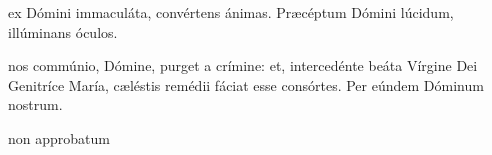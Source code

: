 \documentclass[fontsize=9.5pt,paper=A6,twoside,BCOR=1mm,DIV=21,headinclude]{scrarticle}
\begin{document}
\begin{multicols}{2}

ex Dómini immaculáta, convértens ánimas. Præcéptum Dómini lúcidum, illúminans óculos.

 nos commúnio, Dómine, purget a crímine: et, intercedénte beáta Vírgine Dei Genitríce María, cæléstis remédii fáciat esse consórtes. Per eúndem Dóminum nostrum.

\end{multicols}

\vspace{\fill}

{
	\hspace{\fill}	\scriptsize{non approbatum}

}
\end{document}
